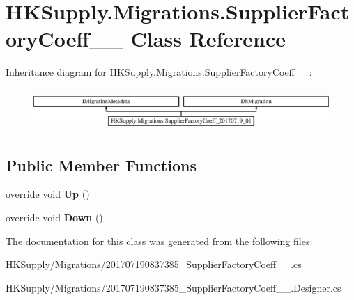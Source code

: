 \hypertarget{class_h_k_supply_1_1_migrations_1_1_supplier_factory_coeff__20170719__01}{}\section{H\+K\+Supply.\+Migrations.\+Supplier\+Factory\+Coeff\+\_\+\_ Class Reference}
\label{class_h_k_supply_1_1_migrations_1_1_supplier_factory_coeff__20170719__01}
Inheritance diagram for H\+K\+Supply.\+Migrations.\+Supplier\+Factory\+Coeff\+\_\+\_\+:\begin{figure}[H]
\begin{center}
\leavevmode
\includegraphics[height=1.604584cm]{class_h_k_supply_1_1_migrations_1_1_supplier_factory_coeff__20170719__01}
\end{center}
\end{figure}
\subsection*{Public Member Functions}
\begin{DoxyCompactItemize}
\item 
\mbox{\label{class_h_k_supply_1_1_migrations_1_1_supplier_factory_coeff__20170719__01_a6d00b7f0c84ad7694a71f4525a009ace}} 
override void {\bfseries Up} ()
\item 
\mbox{\label{class_h_k_supply_1_1_migrations_1_1_supplier_factory_coeff__20170719__01_aa1186e338a8200d7378df2732044f9e1}} 
override void {\bfseries Down} ()
\end{DoxyCompactItemize}


The documentation for this class was generated from the following files\+:\begin{DoxyCompactItemize}
\item 
H\+K\+Supply/\+Migrations/201707190837385\+\_\+\+Supplier\+Factory\+Coeff\+\_\+\_.\+cs\item 
H\+K\+Supply/\+Migrations/201707190837385\+\_\+\+Supplier\+Factory\+Coeff\+\_\+\_.\+Designer.\+cs\end{DoxyCompactItemize}
